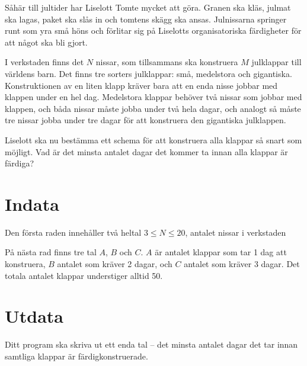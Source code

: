 Såhär till jultider har Liselott Tomte mycket att göra. Granen ska kläs, julmat ska lagas, paket ska slås in och tomtens skägg ska ansas. Julnissarna springer runt som yra små höns och förlitar sig på Liselotts organisatoriska färdigheter för att något ska bli gjort.

I verkstaden finns det $N$ nissar, som tillsammans ska konstruera $M$ julklappar till världens barn. 
 Det finns tre sorters julklappar: små, medelstora och gigantiska. Konstruktionen av en liten klapp kräver bara att en enda nisse jobbar med klappen under en hel dag. Medelstora klappar behöver två nissar som jobbar med klappen, och båda nissar måste jobba under två hela dagar, och analogt så måste tre nissar jobba under tre dagar för att konstruera den gigantiska julklappen.

Liselott ska nu bestämma ett schema för att konstruera alla klappar så snart som möjligt. Vad är det minsta antalet dagar det kommer ta innan alla klappar är färdiga?

\section*{Indata}
Den första raden innehåller två heltal $3 \le N \le 20$, antalet nissar i verkstaden

På nästa rad finns tre tal $A$, $B$ och $C$. $A$ är antalet klappar som tar 1 dag att konstruera, $B$ antalet som kräver 2 dagar, och $C$ antalet som kräver 3 dagar. Det totala antalet klappar understiger alltid 50.

\section*{Utdata}
Ditt program ska skriva ut ett enda tal -- det minsta antalet dagar det tar innan samtliga klappar är färdigkonstruerade.
